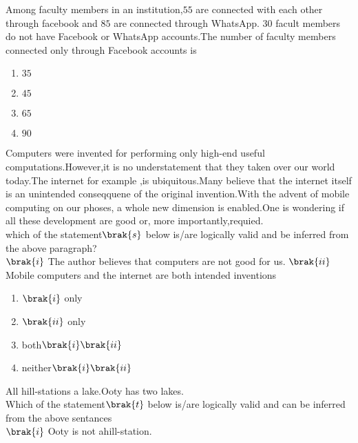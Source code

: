     \item Among  faculty members in an institution,$55$ are connected with each other through facebook and $85$ are connected through WhatsApp. $30$ facult members do not have Facebook or WhatsApp accounts.The number of faculty members connected only through Facebook accounts is\\
    \begin{enumerate}
        \item$35$\\
        \item$45$\\
        \item$65$\\
        \item$90$
    \end{enumerate}
    \item Computers were invented for performing only high-end useful computations.However,it is no understatement that they taken over our world today.The internet for example ,is ubiquitous.Many believe that the internet itself is an unintended conseqquene of the original invention.With the advent of mobile computing on our phoses, a whole new dimension is enabled.One is wondering if all these development are good or, more importantly,requied.\\
    which of the statement$\brak{s}$ below is/are logically valid and be inferred from the above paragraph?\\
    $\brak{i}$ The author believes that computers are not good for us.
    $\brak{ii}$ Mobile computers and the internet are both intended inventions\\
    \begin{enumerate}
        \item $\brak{i}$ only\\
        \item $\brak{ii}$ only\\
        \item both$\brak{i}\brak{ii}$\\
        \item neither$\brak{i}\brak{ii}$
    \end{enumerate}
    \item All hill-stations a lake.Ooty has two lakes.\\
    Which of the statement$\brak{t}$ below is/are logically valid and can be inferred from the above sentances\\
    $\brak{i}$ Ooty is not ahill-station.\\
